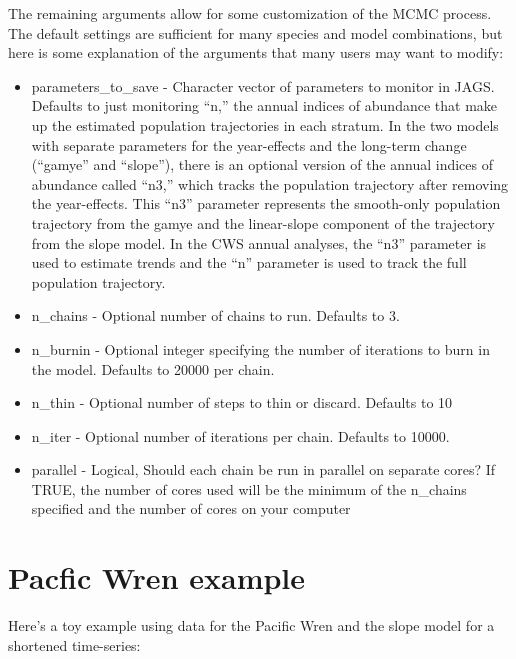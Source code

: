 \documentclass[
]{book}
\begin{document}
The remaining arguments allow for some customization of the MCMC process. The default settings are sufficient for many species and model combinations, but here is some explanation of the arguments that many users may want to modify:

\begin{itemize}
\item
  parameters\_to\_save - Character vector of parameters to monitor in JAGS. Defaults to just monitoring ``n,'' the annual indices of abundance that make up the estimated population trajectories in each stratum. In the two models with separate parameters for the year-effects and the long-term change (``gamye'' and ``slope''), there is an optional version of the annual indices of abundance called ``n3,'' which tracks the population trajectory after removing the year-effects. This ``n3'' parameter represents the smooth-only population trajectory from the gamye and the linear-slope component of the trajectory from the slope model. In the CWS annual analyses, the ``n3'' parameter is used to estimate trends and the ``n'' parameter is used to track the full population trajectory.
\item
  n\_chains - Optional number of chains to run. Defaults to 3.
\item
  n\_burnin - Optional integer specifying the number of iterations to burn in the model. Defaults to 20000 per chain.
\item
  n\_thin - Optional number of steps to thin or discard. Defaults to 10
\item
  n\_iter - Optional number of iterations per chain. Defaults to 10000.
\item
  parallel - Logical, Should each chain be run in parallel on separate cores? If TRUE, the number of cores used will be the minimum of the n\_chains specified and the number of cores on your computer
\end{itemize}

\hypertarget{pacfic-wren-example}{%
\section{Pacfic Wren example}\label{pacfic-wren-example}}

Here's a toy example using data for the Pacific Wren and the slope model for a shortened time-series:
\end{document}
